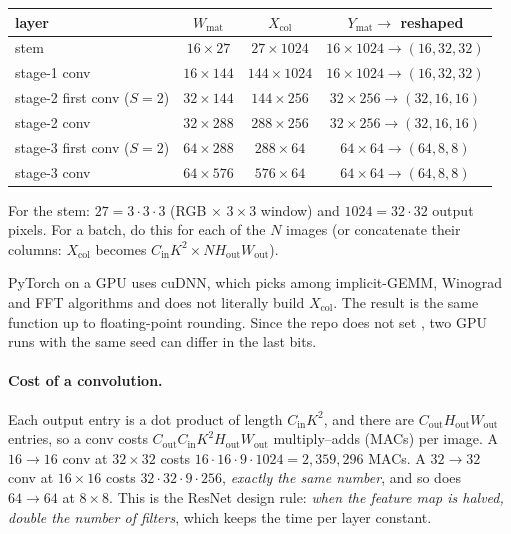 \begin{shapebox}
\begin{center}
\begin{tabular}{@{}lccc@{}}
\toprule
layer & $W_\text{mat}$ & $X_\text{col}$ & $Y_\text{mat}\to$ reshaped\\
\midrule
stem & $16\times 27$ & $27\times 1024$ & $16\times1024 \to (16,32,32)$\\
stage-1 conv & $16\times 144$ & $144\times 1024$ & $16\times 1024\to(16,32,32)$\\
stage-2 first conv ($S{=}2$) & $32\times 144$ & $144\times 256$ & $32\times256\to(32,16,16)$\\
stage-2 conv & $32\times 288$ & $288\times 256$ & $32\times 256\to(32,16,16)$\\
stage-3 first conv ($S{=}2$) & $64\times 288$ & $288\times 64$ & $64\times 64\to(64,8,8)$\\
stage-3 conv & $64\times 576$ & $576\times 64$ & $64\times64\to(64,8,8)$\\
\bottomrule
\end{tabular}
\end{center}
For the stem: $27 = 3\cdot3\cdot3$ (RGB $\times$ $3{\times}3$ window) and $1024 = 32\cdot32$ output pixels. For a batch, do this for each of the $N$ images (or concatenate their columns: $X_\text{col}$ becomes $C_\text{in}K^2\times N H_\text{out}W_\text{out}$).
\end{shapebox}

\begin{warn}
PyTorch on a GPU uses cuDNN, which picks among implicit-GEMM, Winograd and FFT algorithms and does not literally build $X_\text{col}$. The result is the same function up to floating-point rounding. Since the repo does not set , two GPU runs with the same seed can differ in the last bits.
\end{warn}

\paragraph{Cost of a convolution.} Each output entry is a dot product of length $C_\text{in}K^2$, and there are $C_\text{out}H_\text{out}W_\text{out}$ entries, so a conv costs $C_\text{out}C_\text{in}K^2 H_\text{out}W_\text{out}$ multiply--adds (MACs) per image. A $16{\to}16$ conv at $32{\times}32$ costs $16\cdot16\cdot9\cdot1024 = 2{,}359{,}296$ MACs. A $32{\to}32$ conv at $16{\times}16$ costs $32\cdot32\cdot9\cdot256$, \emph{exactly the same number}, and so does $64{\to}64$ at $8{\times}8$. This is the ResNet design rule: \emph{when the feature map is halved, double the number of filters}, which keeps the time per layer constant.

